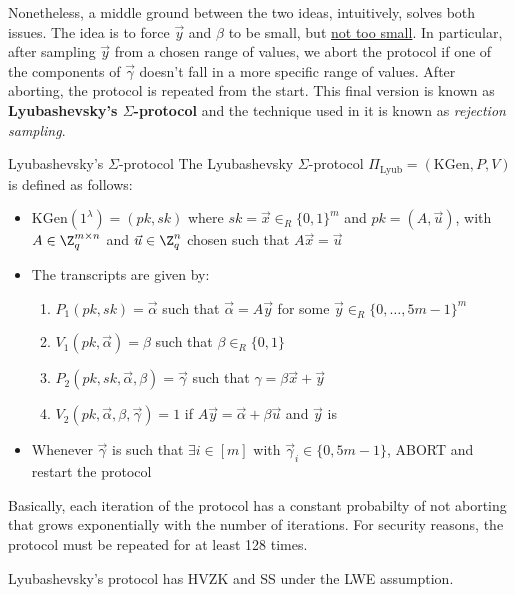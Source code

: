 \documentclass[a4paper, 12pt]{report}
\begin{document}
    Nonetheless, a middle ground between the two ideas, intuitively, solves both issues. The idea is to force $\vec y$ and $\beta$ to be small, but \underline{not too small}. In particular, after sampling $\vec y$ from a chosen range of values, we abort the protocol if one of the components of $\vec \gamma$ doesn't fall in a more specific range of values. After aborting, the protocol is repeated from the start. This final version is known as \textbf{Lyubashevsky's $\Sigma$-protocol} and the technique used in it is known as \textit{rejection sampling}.

    \begin{framedalgo}{Lyubashevsky's $\Sigma$-protocol}
        The Lyubashevsky $\Sigma$-protocol $\Pi_{\text{Lyub}} = (\mathrm{KGen}, P, V)$ is defined as follows:
        \begin{itemize}
            \item $\mathrm{KGen}(1^\lambda) = (pk, sk)$ where $sk = \vec x \in_R \{0,1\}^m$ and $pk = (A, \vec u)$, with $A \in \Z_q^{m \times n}$ and $\vec u \in \Z_q^n$ chosen such that $A \vec x = \vec u$
            \item The transcripts are given by:
            \begin{enumerate}
                \item $P_1(pk,sk) = \vec \alpha$ such that $\vec \alpha = A \vec y$ for some $\vec y \in_R \{0,\ldots, 5m-1\}^m$
                \item $V_1(pk, \vec\alpha) = \beta$ such that $\beta \in_R \{0,1\}$
                \item $P_2(pk,sk,\vec\alpha, \beta) = \vec \gamma$ such that $\gamma = \beta \vec x + \vec y$
                \item $V_2(pk, \vec\alpha, \beta, \vec \gamma) = 1$ if $A \vec y = \vec \alpha + \beta \vec u$ and $\vec y$ is 
            \end{enumerate}
            \item Whenever $\vec \gamma$ is such that $\exists i \in [m]$ with $\vec \gamma_i \in \{0, 5m-1\}$, ABORT and restart the protocol
        \end{itemize}
    \end{framedalgo}

    Basically, each iteration of the protocol has a constant probabilty of not aborting that grows exponentially with the number of iterations. For security reasons, the protocol must be repeated for at least 128 times. 

    \begin{framedprop}{}
        Lyubashevsky's protocol has HVZK and SS under the LWE assumption.
    \end{framedprop}
\end{document}
